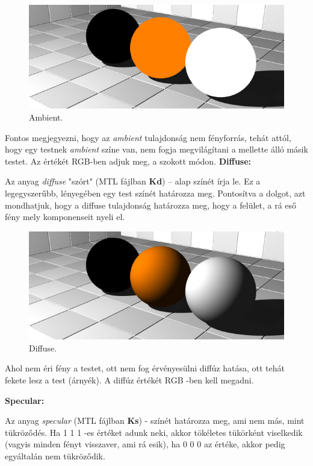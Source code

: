 \begin{figure}[h]
\centering
\includegraphics[scale=0.5]{images/ambient.jpg}
\caption{Ambient.}
\end{figure}
Fontos megjegyezni, hogy az \textsl{ambient} tulajdonság nem fényforrás, tehát attól, hogy egy testnek \textsl{ambient} színe van, nem fogja megvilágítani a mellette álló másik testet. Az értékét RGB-ben adjuk meg, a szokott módon.
\noindent \textbf{Diffuse:}

Az anyag \textsl{diffuse} "szórt" (MTL fájlban \textbf{Kd}) – alap színét írja le. Ez a legegyszerűbb, lényegében egy test színét határozza meg. Pontosítva a dolgot, azt mondhatjuk, hogy a diffuse tulajdonság határozza meg, hogy a felület, a rá eső fény mely komponenseit nyeli el.

\begin{figure}[h]
\centering
\includegraphics[scale=0.5]{images/diffuse.jpg}
\caption{Diffuse.}
\end{figure}
Ahol nem éri fény a testet, ott nem fog érvényesülni diffúz hatása, ott tehát fekete lesz a test (árnyék). A diffúz értékét RGB -ben kell megadni.\newline

\noindent \textbf{Specular:}

Az anyag \textsl{specular} (MTL fájlban \textbf{Ks})  - színét határozza meg, ami nem más, mint tükröződés. Ha 1 1 1 -es értéket adunk neki, akkor tökéletes tükörként viselkedik (vagyis minden fényt visszaver, ami rá esik), ha 0 0 0 az értéke, akkor pedig egyáltalán nem tükröződik.

